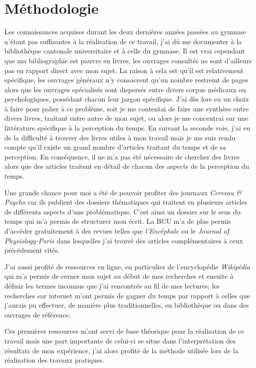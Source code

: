 \documentclass[12pt,fleqn,oneside,openany]{book} %
\begin{document}
\section{Méthodologie} \label{sec:methodologie}
Les connaissances acquises durant les deux dernières années passées au gymnase n'étant pas suffisantes à la réalisation de ce travail, j'ai dû me documenter à la bibliothèque cantonale universitaire et à celle du gymnase. Il est vrai cependant que ma bibliographie est pauvre en livres, les ouvrages consultés ne sont d'ailleurs pas en rapport direct avec mon sujet. La raison à cela est qu'il est relativement spécifique, les ouvrages généraux n'y consacrent qu'un nombre restreint de pages alors que les ouvrages spécialisés sont dispersés entre divers corpus médicaux ou psychologiques, possédant chacun leur jargon spécifique. J'ai dès lors eu un choix à faire pour palier à ce problème, soit je me contentai de faire une synthèse entre divers livres, traitant entre autre de mon sujet, ou alors je me concentrai sur une littérature spécifique à la perception du temps. En suivant la seconde voie, j'ai eu de la difficulté à trouver des livres utiles à mon travail mais je me suis rendu compte qu'il existe un grand nombre d'articles traitant du temps et de sa perception. En conséquence, il ne m'a pas été nécessaire de chercher des livres alors que des articles traitent en détail de chacun des aspects de la perception du temps.

Une grande chance pour moi a été de pouvoir profiter des journaux \emph{Cerveau \& Psycho} car ils publient des dossiers thématiques qui traitent en plusieurs articles de différents aspects d'une problématique. C'est ainsi un dossier sur le sens du temps qui m'a permis de structurer mon écrit. 
La BCU m'a de plus permis d'accéder gratuitement à des revues telles que \emph{l'Encéphale} ou le \emph{Journal of Physiology-Paris} dans lesquelles j'ai trouvé des articles complémentaires à ceux précédement cités. 

J'ai aussi profité de ressources en ligne, en particulier de l'encyclopédie \textit{Wikipédia} qui m'a permis de cerner mon sujet au début de mes recherches et ensuite à définir les termes inconnus que j'ai rencontrés au fil de mes lectures; les recherches sur internet m'ont permis de gagner du temps par rapport à celles que j'aurais pu effectuer, de manière plus traditionnelles, en bibliothèque ou dans des ouvrages de référence.

Ces premières ressources m'ont servi de base théorique pour la réalisation de ce travail mais une part importante de celui-ci se situe dans l'interprétation des résultats de mon expérience, j'ai alors profité de la méthode utilisée lors de la réalisation des travaux pratiques. 
\end{document}
